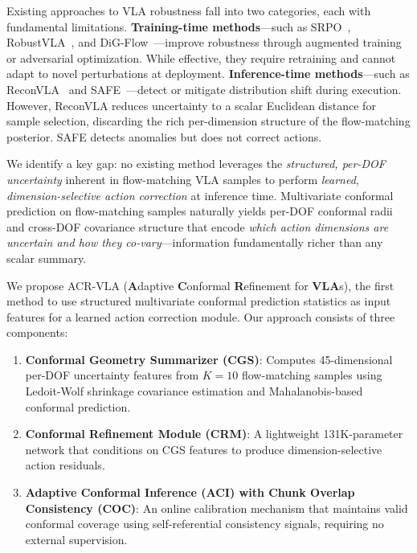 \documentclass[10pt,letterpaper]{article}
\newcommand{\ours}{ACR-VLA}
\newcommand{\crm}{CRM}
\newcommand{\cgs}{CGS}
\newcommand{\aci}{ACI}
\newcommand{\coc}{COC}
\begin{document}
Existing approaches to VLA robustness fall into two categories, each with fundamental limitations.
\textbf{Training-time methods}---such as SRPO~\cite{SRPO}, RobustVLA~\cite{RobustVLA}, and DiG-Flow~\cite{digflow}---improve robustness through augmented training or adversarial optimization.
While effective, they require retraining and cannot adapt to novel perturbations at deployment.
\textbf{Inference-time methods}---such as ReconVLA~\cite{reconvla} and SAFE~\cite{SAFE}---detect or mitigate distribution shift during execution.
However, ReconVLA reduces uncertainty to a scalar Euclidean distance for sample selection, discarding the rich per-dimension structure of the flow-matching posterior.
SAFE detects anomalies but does not correct actions.

We identify a key gap: no existing method leverages the \emph{structured, per-DOF uncertainty} inherent in flow-matching VLA samples to perform \emph{learned, dimension-selective action correction} at inference time.
Multivariate conformal prediction on flow-matching samples naturally yields per-DOF conformal radii and cross-DOF covariance structure that encode \emph{which action dimensions are uncertain and how they co-vary}---information fundamentally richer than any scalar summary.

We propose \ours{} (\textbf{A}daptive \textbf{C}onformal \textbf{R}efinement for \textbf{VLA}s), the first method to use structured multivariate conformal prediction statistics as input features for a learned action correction module.
Our approach consists of three components:
\begin{enumerate}
    \item \textbf{Conformal Geometry Summarizer (\cgs{})}: Computes 45-dimensional per-DOF uncertainty features from $K{=}10$ flow-matching samples using Ledoit-Wolf shrinkage covariance estimation and Mahalanobis-based conformal prediction.
    \item \textbf{Conformal Refinement Module (\crm{})}: A lightweight 131K-parameter network that conditions on \cgs{} features to produce dimension-selective action residuals.
    \item \textbf{Adaptive Conformal Inference (\aci{}) with Chunk Overlap Consistency (\coc{})}: An online calibration mechanism that maintains valid conformal coverage using self-referential consistency signals, requiring no external supervision.
\end{enumerate}
\end{document}

